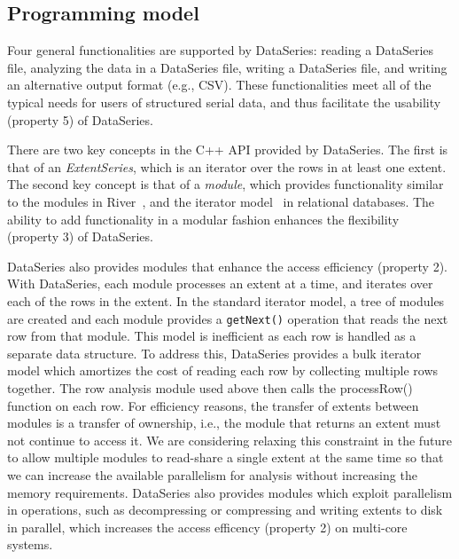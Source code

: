 \documentclass{acm_proc_article-sp}
\begin{document}
\subsection{Programming model}
Four general functionalities are supported by DataSeries:
reading a DataSeries file, 
analyzing the data in a DataSeries file,
writing a DataSeries file,
and writing an alternative output format (e.g., CSV).
These functionalities meet all of the typical needs for
users of structured serial data, and thus facilitate
the usability (property 5) of DataSeries.

There are two key concepts in the C++ API provided by DataSeries. The
first is that of an \textit{ExtentSeries}, which is an iterator over
the rows in at least one extent.  
The second key concept is that of a \textit{module}, which provides
functionality similar to the modules in River~\cite{river99}, and the
iterator model~\cite{graefeQueryProcessing93} in relational databases.
The ability to add functionality in a modular fashion enhances
the flexibility (property 3) of DataSeries.

DataSeries also provides modules that enhance the access efficiency
(property 2).
With DataSeries, each module processes an extent at a time, and
iterates over each of the rows in the extent.  In the standard
iterator model, a tree of modules are created and each module provides
a {\tt getNext()} operation that reads the next row from that module.
This model is inefficient as each row is handled as a separate data
structure.  To address this, DataSeries provides a 
bulk iterator model which amortizes the cost of reading each
row by collecting multiple rows together.  The row analysis module
used above then calls the processRow() function on each row.  For
efficiency reasons, the transfer of extents between modules is a
transfer of ownership, i.e., the module that returns an extent must
not continue to access it. We are considering relaxing this
constraint in the future to allow multiple modules to read-share a single
extent at the same time so that we can increase the available parallelism
for analysis without increasing the memory requirements.
DataSeries also provides modules which exploit parallelism in operations,
such as decompressing or compressing and writing
extents to disk in parallel, which increases the access efficency
(property 2) on multi-core systems.
\end{document}
